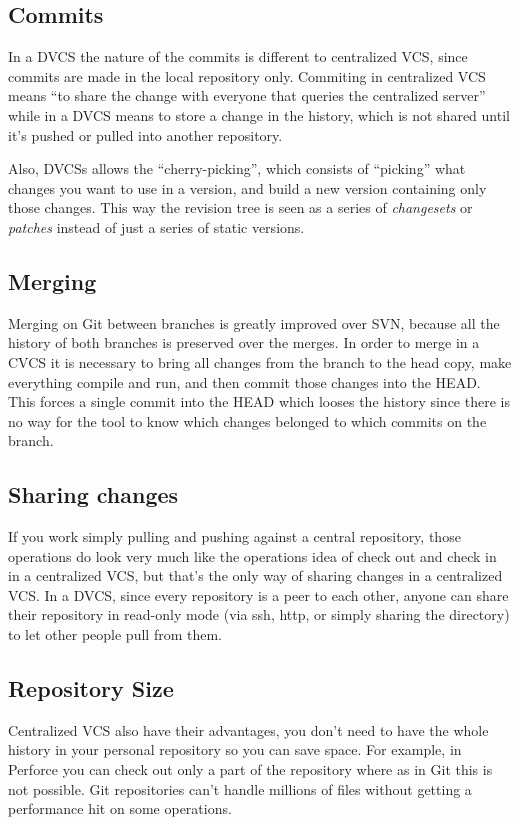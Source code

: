 \documentclass[a4paper,10pt]{article}
\begin{document}
\subsection{Commits}
\label{Commits}
In a DVCS the nature of the commits is different to centralized VCS, since commits are made in the local repository only. 
Commiting in centralized VCS means ``to share the change with everyone that queries the centralized server'' while in a 
DVCS means to store a change in the history, which is not shared until it's pushed or pulled into another repository.

Also, DVCSs allows the ``cherry-picking'', 
which consists of ``picking'' what changes you want to use in a version, and build 
a new version containing only those changes. This way the revision tree is seen as a 
series of \emph{changesets} or \emph{patches} instead of just a series of static versions.

\subsection{Merging}
Merging on Git between branches is greatly improved over SVN, because all the history of 
both branches is preserved over the merges. In order to merge in a CVCS it is necessary to bring all changes from the
branch to the head copy, make everything compile and run, and then commit those changes into the HEAD. This forces
a single commit into the HEAD which looses the history since there is no way for the tool to know which changes belonged
to which commits on the branch.

\subsection{Sharing changes}
If you work simply pulling and pushing against a central repository, those operations do look 
very much like the operations idea of check out and check in in a centralized VCS, 
but that's the only way of sharing changes in a centralized VCS.
In a DVCS, since every repository is a peer to each other, anyone can share their repository in 
read-only mode (via ssh, http, or simply sharing the directory) to let other people pull from them. 

\subsection{Repository Size}

Centralized VCS also have their advantages, you don't need to have the whole history in your 
personal repository so you can save space. For example, in Perforce you can check out only a part of the 
repository\cite{perforceclientspec} where as in Git this is not possible.
Git repositories can't handle millions of files without getting a performance hit on some operations\cite{linusgit}.
\end{document}
